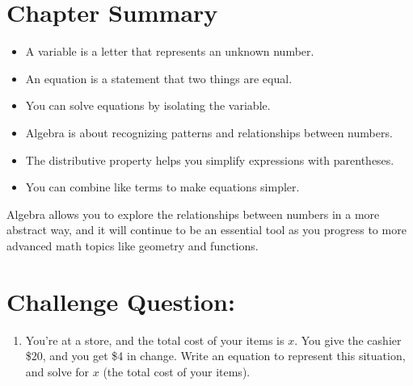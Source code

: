 \section{Chapter Summary}
\begin{itemize}
    \item A variable is a letter that represents an unknown number.
    \item An equation is a statement that two things are equal.
    \item You can solve equations by isolating the variable.
    \item Algebra is about recognizing patterns and relationships between numbers.
    \item The distributive property helps you simplify expressions with parentheses.
    \item You can combine like terms to make equations simpler.
\end{itemize}

Algebra allows you to explore the relationships between numbers in a more abstract way, and it will continue to be an essential tool as you progress to more advanced math topics like geometry and functions.

\section{Challenge Question:}
\begin{enumerate}[label=(\alph*)]
    \item You’re at a store, and the total cost of your items is $x$. You give the cashier \$20, and you get \$4 in change. Write an equation to represent this situation, and solve for $x$ (the total cost of your items).

\end{enumerate}